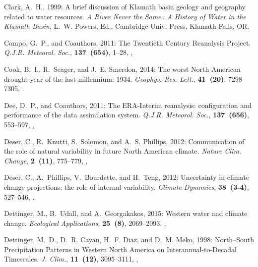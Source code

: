 \documentclass[final, double]{ua-thesis}
\begin{document}
\begin{thebibliography}{}
Clark, A.~H., 1999: A brief discussion of {Klamath} basin geology and geography
  related to water resources. \textit{A {River} {Never} the {Same} : {A}
  {History} of {Water} in the {Klamath} {Basin}}, L.~W. Powers, Ed., Cambridge
  Univ. Press, Klamath Falls, OR.

Compo, G.~P., and Coauthors, 2011: The {Twentieth} {Century} {Reanalysis}
  {Project}. \textit{Q.J.R. Meteorol. Soc.}, \textbf{137~(654)}, 1--28,
  ,

Cook, B.~I., R.~Seager, and J.~E. Smerdon, 2014: The worst {North} {American}
  drought year of the last millennium: 1934. \textit{Geophys. Res. Lett.},
  \textbf{41~(20)}, 7298--7305, .

Dee, D.~P., and Coauthors, 2011: The {ERA}-{Interim} reanalysis: configuration
  and performance of the data assimilation system. \textit{Q.J.R. Meteorol.
  Soc.}, \textbf{137~(656)}, 553--597, ,

Deser, C., R.~Knutti, S.~Solomon, and A.~S. Phillips, 2012{}:
  Communication of the role of natural variability in future {North} {American}
  climate. \textit{Nature Clim. Change}, \textbf{2~(11)}, 775--779,
  ,

Deser, C., A.~Phillips, V.~Bourdette, and H.~Teng, 2012{}:
  Uncertainty in climate change projections: the role of internal variability.
  \textit{Climate Dynamics}, \textbf{38~(3-4)}, 527--546,
  .

Dettinger, M., B.~Udall, and A.~Georgakakos, 2015: Western water and climate
  change. \textit{Ecological Applications}, \textbf{25~(8)}, 2069--2093,
  ,

Dettinger, M.~D., D.~R. Cayan, H.~F. Diaz, and D.~M. Meko, 1998:
  North–{South} {Precipitation} {Patterns} in {Western} {North} {America} on
  {Interannual}-to-{Decadal} {Timescales}. \textit{J. Clim.}, \textbf{11~(12)},
  3095--3111, ,


\end{thebibliography}
\end{document}
